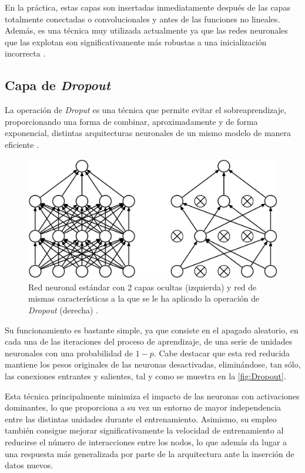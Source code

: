 En la práctica, estas capas son insertadas inmediatamente después de las capas totalmente conectadas o convolucionales y antes de las funciones no lineales. Además, es una técnica muy utilizada actualmente ya que las redes neuronales que las explotan son significativamente más robustas a una inicialización incorrecta \cite{CS231n}.

\subsection{Capa de \textit{Dropout}}

La operación de \textit{Droput} es una técnica que permite evitar el sobreaprendizaje, proporcionando una forma de combinar, aproximadamente y de forma exponencial, distintas arquitecturas neuronales de un mismo modelo de manera eficiente \cite{Srivastava}. 

\begin{figure}
    \centering
    \includegraphics[scale=0.25]{Images/Dropout.png}
    \caption{Red neuronal estándar con 2 capas ocultas (izquierda) y red de mismas características a la que se le ha aplicado la operación de \textit{Dropout} (derecha) \cite{Srivastava}.}
    \label{fig:Dropout}
\end{figure}

Su funcionamiento es bastante simple, ya que consiste en el apagado aleatorio, en cada una de las iteraciones del proceso de aprendizaje, de una serie de unidades neuronales con una probabilidad de $1 - p$. Cabe destacar que esta red reducida mantiene los pesos originales de las neuronas desactivadas, eliminándose, tan sólo, las conexiones entrantes y salientes, tal y como se muestra en la \autoref{fig:Dropout}.

Esta técnica principalmente minimiza el impacto de las neuronas con activaciones dominantes, lo que proporciona a su vez un entorno de mayor independencia entre las distintas unidades durante el entrenamiento. Asimismo, su empleo también consigue mejorar significativamente la velocidad de entrenamiento al reducirse el número de interacciones entre los nodos, lo que además da lugar a una respuesta más generalizada por parte de la arquitectura ante la inserción de datos nuevos.

